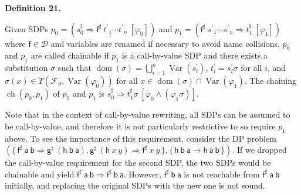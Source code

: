 \documentclass[10pt,a4paper]{amsart}
\begin{document}
 
 
\par\medskip\noindent\textbf{Definition 21.}\par
 
 
Given SDPs $p_{0}=({s_{0}^{\sharp}}\Rightarrow{{\mathsf{f}^{\sharp}}\ {{t^{\prime}}_{1}\cdots{t^{\prime}}_{n}}}\ [\varphi_{0}])$ and $p_{1}=({{\mathsf{f}^{\sharp}}\ {{s^{\prime}}_{1}\cdots{s^{\prime}}_{n}}}\Rightarrow{t_{1}^{\sharp}}\ [\varphi_{1}])$ where $\mathsf{f}\in\mathcal{D}$ and variables are renamed if necessary to avoid name collisions, $p_{0}$ and $p_{1}$ are called chainable if $p_{1}$ is a call-by-value SDP and there exists a substitution $\sigma$ such that $\operatorname{dom}(\sigma)=\bigcup_{i=1}^{n}\operatorname{Var}(s_{i}^{\prime})$, $t_{i}^{\prime}=s_{i}^{\prime}\sigma$ for all $i$, and $\sigma(x)\in T({\mathcal{F}}_{\vartheta},\operatorname{Var}(\varphi_{0}))$ for all $x\in\operatorname{dom}(\sigma)\cap\operatorname{Var}(\varphi_{1})$. The chaining $\operatorname{ch}(p_{0},p_{1})$ of $p_{0}$ and $p_{1}$ is ${s_{0}^{\sharp}}\Rightarrow{t_{1}^{\sharp}\sigma}\ [\varphi_{0}\wedge(\varphi_{1}\sigma)]$.\par
 
 
 
 
Note that in the context of call-by-value rewriting, all SDPs can be assumed to be call-by-value, and therefore it is not particularly restrictive to so require $p_{1}$ above. To see the importance of this requirement, consider the DP problem $(\{\,{{{\mathsf{f}^{\sharp}}\ {\mathsf{a}}}\ {\mathsf{b}}}\Rightarrow{{\mathsf{g}^{\sharp}}\ {({{\mathsf{h}}\ {\mathsf{b}}}\ {\mathsf{a}})}},{{\mathsf{g}^{\sharp}}\ {({{\mathsf{h}}\ {x}}\ {y})}}\Rightarrow{{{\mathsf{f}^{\sharp}}\ {x}}\ {y}}\,\},\{\,{{\mathsf{h}}\ {\mathsf{b}}}\ {\mathsf{a}}\rightarrow{{\mathsf{h}}\ {\mathsf{a}}}\ {\mathsf{b}}\,\})$. If we dropped the call-by-value requirement for the second SDP, the two SDPs would be chainable and yield ${{{\mathsf{f}^{\sharp}}\ {\mathsf{a}}}\ {\mathsf{b}}}\Rightarrow{{{\mathsf{f}^{\sharp}}\ {\mathsf{b}}}\ {\mathsf{a}}}$. However, ${{\mathsf{f}^{\sharp}}\ {\mathsf{b}}}\ {\mathsf{a}}$ is not reachable from ${{\mathsf{f}^{\sharp}}\ {\mathsf{a}}}\ {\mathsf{b}}$ initially, and replacing the original SDPs with the new one is not sound.\par
 
\end{document}
